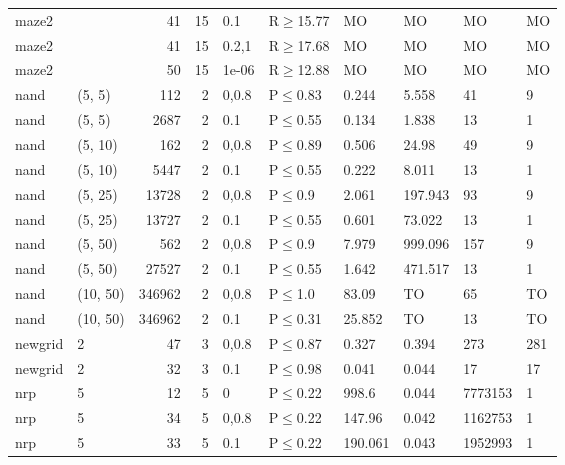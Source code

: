 \begin{longtable}{llrrllllll}
 maze2         &          &     	41 &  15 & 0.1   & R$\geq$15.77 & MO      & MO      & MO      & MO   \\
 maze2         &          &     	41 &  15 & 0.2,1 & R$\geq$17.68 & MO      & MO      & MO      & MO   \\
 maze2         &          &     	50 &  15 & 1e-06 & R$\geq$12.88 & MO      & MO      & MO      & MO   \\
 nand          & (5, 5)   &    	112 &   2 & 0,0.8 & P$\leq$0.83  & 0.244   & 5.558   & 41      & 9    \\
 nand          & (5, 5)   &   	2687 &   2 & 0.1   & P$\leq$0.55  & 0.134   & 1.838   & 13      & 1    \\
 nand          & (5, 10)  &    	162 &   2 & 0,0.8 & P$\leq$0.89  & 0.506   & 24.98   & 49      & 9    \\
 nand          & (5, 10)  &   	5447 &   2 & 0.1   & P$\leq$0.55  & 0.222   & 8.011   & 13      & 1    \\
 nand          & (5, 25)  &  	13728 &   2 & 0,0.8 & P$\leq$0.9   & 2.061   & 197.943 & 93      & 9    \\
 nand          & (5, 25)  &  	13727 &   2 & 0.1   & P$\leq$0.55  & 0.601   & 73.022  & 13      & 1    \\
 nand          & (5, 50)  &    	562 &   2 & 0,0.8 & P$\leq$0.9   & 7.979   & 999.096 & 157     & 9    \\
 nand          & (5, 50)  &  	27527 &   2 & 0.1   & P$\leq$0.55  & 1.642   & 471.517 & 13      & 1    \\
 nand          & (10, 50) & 	346962 &   2 & 0,0.8 & P$\leq$1.0   & 83.09   & TO      & 65      & TO   \\
 nand          & (10, 50) & 	346962 &   2 & 0.1   & P$\leq$0.31  & 25.852  & TO      & 13      & TO   \\
 newgrid       & 2        &     	47 &   3 & 0,0.8 & P$\leq$0.87  & 0.327   & 0.394   & 273     & 281  \\
 newgrid       & 2        &     	32 &   3 & 0.1   & P$\leq$0.98  & 0.041   & 0.044   & 17      & 17   \\
 nrp           & 5        &     	12 &   5 & 0     & P$\leq$0.22  & 998.6   & 0.044   & 7773153 & 1    \\
 nrp           & 5        &     	34 &   5 & 0,0.8 & P$\leq$0.22  & 147.96  & 0.042   & 1162753 & 1    \\
 nrp           & 5        &     	33 &   5 & 0.1   & P$\leq$0.22  & 190.061 & 0.043   & 1952993 & 1    \\

\end{longtable}
